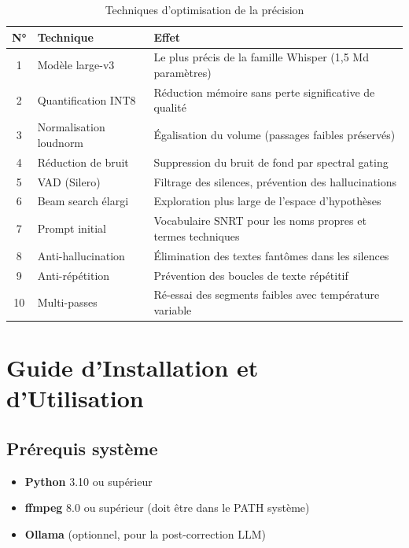 \documentclass[12pt,a4paper]{report}
\begin{document}
\begin{table}[H]
    \centering
    \caption{Techniques d'optimisation de la précision}
    \label{tab:optim}
    \begin{tabular}{@{} c p{4cm} p{6.5cm} @{}}
        \toprule
        \textbf{N°} & \textbf{Technique} & \textbf{Effet} \\
        \midrule
        1 & Modèle large-v3 & Le plus précis de la famille Whisper (1,5 Md paramètres) \\
        2 & Quantification INT8 & Réduction mémoire sans perte significative de qualité \\
        3 & Normalisation loudnorm & Égalisation du volume (passages faibles préservés) \\
        4 & Réduction de bruit & Suppression du bruit de fond par spectral gating \\
        5 & VAD (Silero) & Filtrage des silences, prévention des hallucinations \\
        6 & Beam search élargi & Exploration plus large de l'espace d'hypothèses \\
        7 & Prompt initial & Vocabulaire SNRT pour les noms propres et termes techniques \\
        8 & Anti-hallucination & Élimination des textes fantômes dans les silences \\
        9 & Anti-répétition & Prévention des boucles de texte répétitif \\
        10 & Multi-passes & Ré-essai des segments faibles avec température variable \\
        \bottomrule
    \end{tabular}
\end{table}

\chapter{Guide d'Installation et d'Utilisation}

\section{Prérequis système}

\begin{itemize}
    \item \textbf{Python} 3.10 ou supérieur
    \item \textbf{ffmpeg} 8.0 ou supérieur (doit être dans le PATH système)
    \item \textbf{Ollama} (optionnel, pour la post-correction LLM)
\end{itemize}
\end{document}
